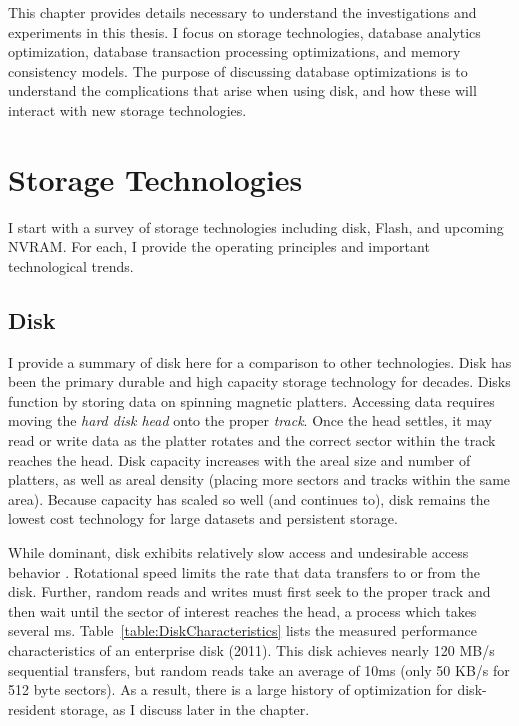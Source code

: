 This chapter provides details necessary to understand the investigations and experiments in this thesis.
I focus on storage technologies, database analytics optimization, database transaction processing optimizations, and memory consistency models.
The purpose of discussing database optimizations is to understand the complications that arise when using disk, and how these will interact with new storage technologies.

\section{Storage Technologies}
\label{sec:Background:Storage}

I start with a survey of storage technologies including disk, Flash, and upcoming NVRAM.
For each, I provide the operating principles and important technological trends.



\subsection{Disk}
\label{sec:Background:Storage:Disk}
I provide a summary of disk here for a comparison to other technologies.
Disk has been the primary durable and high capacity storage technology for decades.
Disks function by storing data on spinning magnetic platters.
Accessing data requires moving the \emph{hard disk head} onto the proper \emph{track}.
Once the head settles, it may read or write data as the platter rotates and the correct sector within the track reaches the head.
Disk capacity increases with the areal size and number of platters, as well as areal density (placing more sectors and tracks within the same area).
Because capacity has scaled so well (and continues to), disk remains the lowest cost technology for large datasets and persistent storage.

While dominant, disk exhibits relatively slow access and undesirable access behavior \cite{RuemmlerWilkes94}.
Rotational speed limits the rate that data transfers to or from the disk.
Further, random reads and writes must first seek to the proper track and then wait until the sector of interest reaches the head, a process which takes several ms.
Table~\ref{table:DiskCharacteristics} lists the measured performance characteristics of an enterprise disk (2011).
This disk achieves nearly 120 MB/s sequential transfers, but random reads take an average of 10ms (only 50 KB/s for 512 byte sectors).
As a result, there is a large history of optimization for disk-resident storage, as I discuss later in the chapter.

